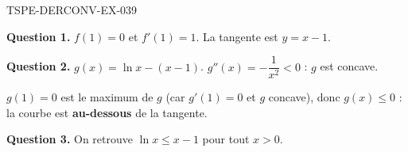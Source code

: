 \begin{corrige}{TSPE-DERCONV-EX-039}

\textbf{Question 1.} $f(1)=0$ et $f'(1)=1$. La tangente est $y = x - 1$.


\textbf{Question 2.} $g(x) = \ln x - (x-1)$. $g''(x) = -\dfrac{1}{x^2} < 0$ : $g$ est concave.

$g(1) = 0$ est le maximum de $g$ (car $g'(1) = 0$ et $g$ concave), donc $g(x) \leq 0$ : la courbe est \textbf{au-dessous} de la tangente.

\textbf{Question 3.} On retrouve $\ln x \leq x - 1$ pour tout $x > 0$.

\end{corrige}
